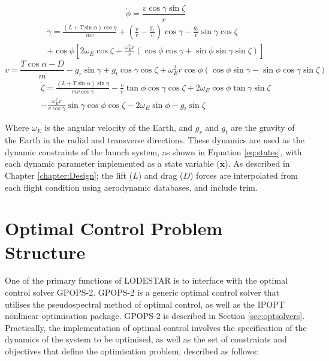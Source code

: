 \begin{equation}
\dot{\phi} = \frac{v\cos\gamma\sin\zeta}{r}
\end{equation}
\begin{equation}
\begin{split}
\dot{\gamma} = \frac{(L + T\sin\alpha) \cos\eta}{mv} + (\frac{v}{r}-\frac{g_r}{v})\cos\gamma -\frac{g_t}{v}\sin\gamma\cos\zeta
 \\ + \cos\phi[2\omega_E \cos\zeta + \frac{\omega_E^2 r}{v}(\cos\phi\cos\gamma+\sin\phi\sin\gamma\sin\zeta)]
\end{split}
\end{equation}
\begin{equation}
\dot{v} = \frac{T\cos\alpha - D}{m}-g_r\sin\gamma +g_t\cos\gamma\cos\zeta
+ \omega_E^2 r\cos\phi(\cos\phi\sin\gamma-\sin\phi\cos\gamma\sin\zeta)
\end{equation}
\begin{equation}\label{eq:heading}
\begin{split}
\dot{\zeta} = \frac{(L + T\sin\alpha) \sin\eta}{mv \cos \gamma}-\frac{v}{r}\tan\phi\cos\gamma\cos\zeta +2\omega_E\cos\phi\tan\gamma\sin\zeta 
\\ - \frac{\omega_E^2 r}{v\cos\gamma}\sin\gamma\cos\phi\cos\zeta-2\omega_E\sin\phi -g_t\sin\zeta
\end{split}
\end{equation}

Where $\omega_E$ is the angular velocity of the Earth, and $g_r$ and $g_t$ are the gravity of the Earth in the radial and transverse directions. These dynamics are used as the dynamic constraints of the launch system, as shown in Equation \ref{eq:states}, with each dynamic parameter implemented as a state variable ($\mathbf{x}$).  As described in Chapter \ref{chapter:Design}; the lift ($L$) and drag ($D$) forces are interpolated from each flight condition using aerodynamic databases, and include trim.

\section{Optimal Control Problem Structure}\label{sec:optstruct}

One of the primary functions of LODESTAR is to interface with the optimal control solver GPOPS-2. GPOPS-2 is a generic optimal control solver that utilises the pseudospectral method of optimal control, as well as the IPOPT nonlinear optimisation package. GPOPS-2 is described in Section \ref{sec:optsolvers}. Practically, the implementation of optimal control involves the specification of the dynamics of the system to be optimised, as well as the set of constraints and objectives that define the optimisation problem, described as follows:

